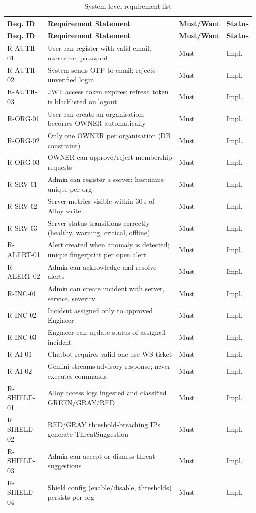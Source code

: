 \begin{longtable}{@{}l >{\raggedright\arraybackslash}p{8.3cm} l l@{}}
\caption{System-level requirement list}\label{tab:reqlist}\\
\toprule
\textbf{Req. ID} & \textbf{Requirement Statement} & \textbf{Must/Want} & \textbf{Status}\\
\midrule
\endfirsthead
\toprule
\textbf{Req. ID} & \textbf{Requirement Statement} & \textbf{Must/Want} & \textbf{Status}\\
\midrule
\endhead
\bottomrule
\endlastfoot
R-AUTH-01 & User can register with valid email, username, password & Must & Impl.\\
R-AUTH-02 & System sends OTP to email; rejects unverified login & Must & Impl.\\
R-AUTH-03 & JWT access token expires; refresh token is blacklisted on logout & Must & Impl.\\
R-ORG-01  & User can create an organisation; becomes OWNER automatically & Must & Impl.\\
R-ORG-02  & Only one OWNER per organisation (DB constraint) & Must & Impl.\\
R-ORG-03  & OWNER can approve/reject membership requests & Must & Impl.\\
R-SRV-01  & Admin can register a server; hostname unique per org & Must & Impl.\\
R-SRV-02  & Server metrics visible within 30\,s of Alloy write & Must & Impl.\\
R-SRV-03  & Server status transitions correctly (healthy, warning, critical, offline) & Must & Impl.\\
R-ALERT-01 & Alert created when anomaly is detected; unique fingerprint per open alert & Must & Impl.\\
R-ALERT-02 & Admin can acknowledge and resolve alerts & Must & Impl.\\
R-INC-01   & Admin can create incident with server, service, severity & Must & Impl.\\
R-INC-02   & Incident assigned only to approved Engineer & Must & Impl.\\
R-INC-03   & Engineer can update status of assigned incident & Must & Impl.\\
R-AI-01    & Chatbot requires valid one-use WS ticket & Must & Impl.\\
R-AI-02    & Gemini streams advisory response; never executes commands & Must & Impl.\\
R-SHIELD-01 & Alloy access logs ingested and classified GREEN/GRAY/RED & Must & Impl.\\
R-SHIELD-02 & RED/GRAY threshold-breaching IPs generate ThreatSuggestion & Must & Impl.\\
R-SHIELD-03 & Admin can accept or dismiss threat suggestions & Must & Impl.\\
R-SHIELD-04 & Shield config (enable/disable, thresholds) persists per org & Must & Impl.\\
\end{longtable}

